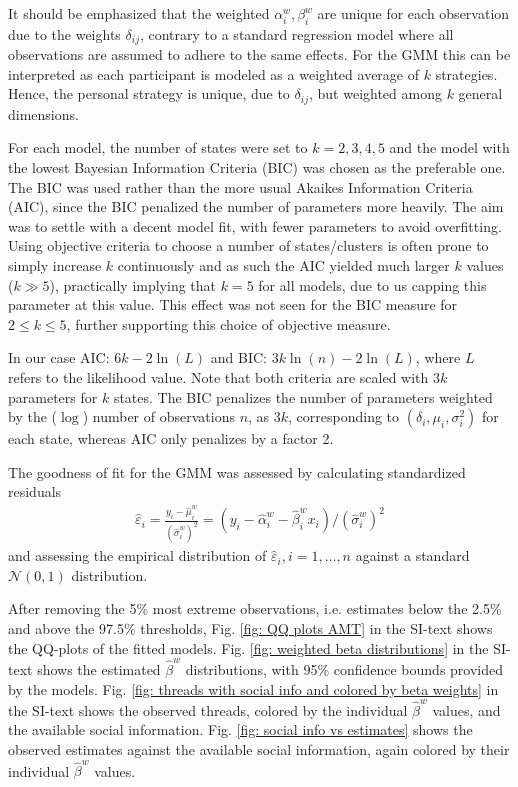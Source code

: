 \documentclass[9pt,a4paper,twocolumn,lineno]{article}
\begin{document}
It should be emphasized that the weighted $\alpha_i^w,\beta_i^w$ are unique for each observation due to the weights $\delta_{ij}$, contrary to a standard regression model where all observations are assumed to adhere to the same effects. For the GMM this can be interpreted as each participant is modeled as a weighted average of $k$ strategies. Hence, the personal strategy is unique, due to $\delta_{ij}$, but weighted among $k$ general dimensions. 

For each model, the number of states were set to $k=2,3,4,5$ and the model with the lowest Bayesian Information Criteria (BIC) was chosen as the preferable one. The BIC was used rather than the more usual Akaikes Information Criteria (AIC), since the BIC penalized the number of parameters more heavily. The aim was to settle with a decent model fit, with fewer parameters to avoid overfitting. Using objective criteria to choose a number of states/clusters is often prone to simply increase $k$ continuously \cite{hastie2009} and as such the AIC yielded much larger $k$ values ($k \gg 5$), practically implying that $k=5$ for all models, due to us capping this parameter at this value. This effect was not seen for the BIC measure for $2\leq k \leq 5$, further supporting this choice of objective measure.

In our case AIC: $6k-2\ln(L)$ and BIC: $3k\ln(n)-2\ln(L)$, where $L$ refers to the likelihood value. Note that both criteria are scaled with $3k$ parameters for $k$ states. The BIC penalizes the number of parameters weighted by the ($\log$) number of observations $n$, 
as $3k$, corresponding to $(\delta_i,\mu_i,\sigma^2_i)$ for each state, whereas AIC only penalizes by a factor 2.

The goodness of fit for the GMM was assessed by calculating standardized residuals
\begin{align}
 	\hat{\varepsilon}_i = \frac{y_i - \hat{\mu}^w_i}{(\hat{\sigma}^w_i)^2} = (y_i - \hat{\alpha}^w_i-\hat{\beta}^w_ix_i)/(\hat{\sigma}^w_i)^2 \label{eq: GMM residuals}
\end{align}
and assessing the empirical distribution of $\hat{\varepsilon}_i, i=1,\dots,n$ against a standard $\mathcal{N}(0,1)$ distribution.

After removing the 5\% most extreme observations, i.e. estimates below the 2.5\% and above the 97.5\% thresholds, Fig. \ref{fig: QQ plots AMT} in the SI-text shows the QQ-plots of the fitted models. Fig. \ref{fig: weighted beta distributions} in the SI-text shows the estimated $\hat{\beta}^w$ distributions, with 95\% confidence bounds provided by the models. Fig. \ref{fig: threads with social info and colored by beta weights} in the SI-text shows the observed threads, colored by the individual $\hat{\beta}^w$ values, and the available social information. Fig. \ref{fig: social info vs estimates} shows the observed estimates against the available social information, again colored by their individual $\hat{\beta}^w$ values.
\end{document}
